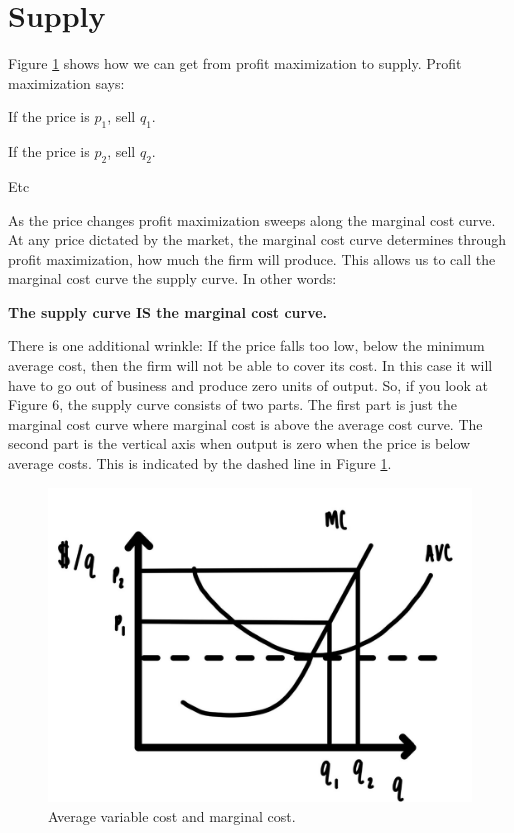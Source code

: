\documentclass[
]{book}
\begin{document}
\hypertarget{supply-1}{%
\section{Supply}\label{supply-1}}

Figure \ref{fig:supply06} shows how we can get from profit maximization to supply. Profit maximization says:

\begin{center}
If the price is \(p_1\), sell \(q_1\).

If the price is \(p_2\), sell \(q_2\).

Etc

\end{center}

As the price changes profit maximization sweeps along the marginal cost curve. At any price dictated by the market, the marginal cost curve determines through profit maximization, how much the firm will produce. This allows us to call the marginal cost curve the supply curve. In other words:

\begin{center}

\begin{iucolor}
\textbf{The supply curve IS the marginal cost curve.}

\end{iucolor}

\end{center}

There is one additional wrinkle: If the price falls too low, below the minimum average cost, then the firm will not be able to cover its cost. In this case it will have to go out of business and produce zero units of output. So, if you look at Figure 6, the supply curve consists of two parts. The first part is just the marginal cost curve where marginal cost is above the average cost curve. The second part is the vertical axis when output is zero when the price is below average costs. This is indicated by the dashed line in Figure \ref{fig:supply06}.

\begin{figure}

{\centering \includegraphics[width=0.75\linewidth]{img/supply/fig6} 

}

\caption{Average variable cost and marginal cost.}\label{fig:supply06}
\end{figure}
\end{document}
